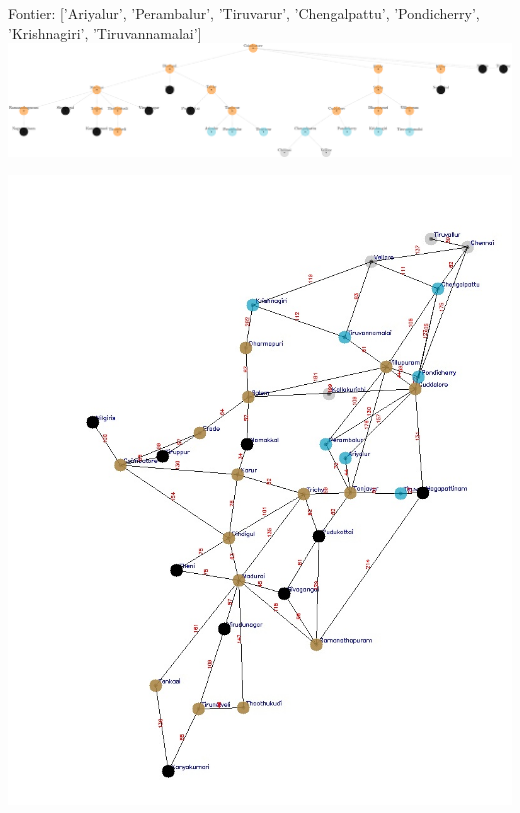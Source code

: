 \documentclass[xcolor=table]{beamer}
\begin{document}
\begin{frame}
  { \tiny Fontier: ['Ariyalur', 'Perambalur', 'Tiruvarur', 'Chengalpattu', 'Pondicherry', 'Krishnagiri', 'Tiruvannamalai']}
  \includegraphics[width=1\textwidth]{../BFSNodes/35-1.png}
  \begin{center}
    \includegraphics[height=0.6\textheight]{../BFSoutput/tamilBFS33.jpg}
  \end{center}
\end{frame}
\end{document}
